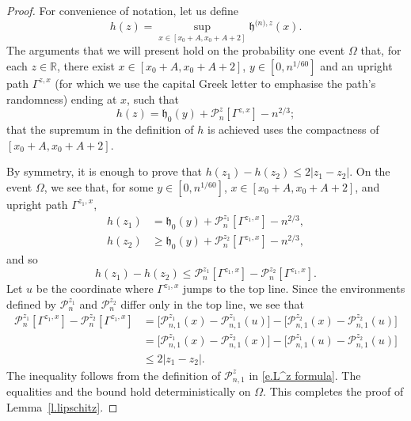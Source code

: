 \documentclass[oneside,final,11pt]{amsart}
\theoremstyle{definition}
\renewcommand{\L}{\CP}
\newcommand{\fh}{\mathfrak{h}}
\newcommand{\hz}[1]{\fh^{{\scriptscriptstyle(}n{\scriptscriptstyle)},#1}}
\newcommand{\R}{\mathbb{R}}
\newcommand{\1}[1]{\mathbf{1}_{#1}}
\newcommand{\hlim}{\mathfrak{h}}
\newcommand{\CP}{\mathcal{P}}
\numberwithin{equation}{section}
\begin{document}
\begin{proof}
For convenience of notation, let us define
%
$$h(z) = \sup_{x\in[x_0+A,x_0+A+ 2]}\hz{z}(x).$$
%
The arguments that we will present hold on the probability one event $\Omega$ that, for each $z\in \R$, there exist $x\in [x_0+A,x_0+A+ 2]$, $y\in [0, n^{1/60}]$ and an upright path $\Gamma^{z,x}$ (for which we use the capital Greek letter to emphasise the path's randomness) ending at $x$, such that
%
$$h(z) = \hlim_0(y) + \L_n^z[\Gamma^{z,x}] - n^{2/3};$$
%
that the supremum in the definition of $h$ is achieved uses the compactness of $[x_0+A,x_0+A+ 2]$.

By symmetry, it is enough to prove that $h(z_1) - h(z_2) \leq 2 |z_1-z_2|.$
On the event $\Omega$, we see that, for some $y\in [0, n^{1/60}]$, $x\in [x_0+A,x_0+A+ 2]$, and upright path $\Gamma^{z_1,x}$,
%
\begin{align*}
h(z_1) &= \hlim_0(y) + \L^{z_1}_n[\Gamma^{z_1,x}] - n^{2/3},\\
h(z_2) &\geq \hlim_0(y) + \L^{z_2}_n[\Gamma^{z_1,x}] - n^{2/3},
\end{align*}
%
and so
%
$$h(z_1) - h(z_2) \leq \L_n^{z_1}[\Gamma^{z_1,x}] - \L_n^{z_2}[\Gamma^{z_1,x}].$$
%
Let $u$ be the coordinate where $\Gamma^{z_1,x}$ jumps to the top line. Since the environments defined by $\L_n^{z_1}$ and $\L_n^{z_2}$ differ only in the top line, we see that
%
\begin{align*}
\L_n^{z_1}[\Gamma^{z_1,x}] - \L_n^{z_2}[\Gamma^{z_1,x}]
%
&=\big[\L_{n,1}^{z_1}(x) - \L_{n,1}^{z_1}(u)\big] - \big[\L_{n,1}^{z_2}(x) - \L_{n,1}^{z_2}(u)\big] \\
%
&= \big[\L_{n,1}^{z_1}(x) - \L_{n,1}^{z_2}(x)\big] - \big[\L_{n,1}^{z_1}(u) - \L_{n,1}^{z_2}(u)\big]\\
%
&\leq 2|z_1-z_2|.
\end{align*}
%
The inequality follows from the definition of $\L^z_{n,1}$ in \eqref{e.L^z formula}.
The equalities and the bound hold deterministically  on $\Omega$. This completes the proof of Lemma~\ref{l.lipschitz}.
\end{proof}
\end{document}
